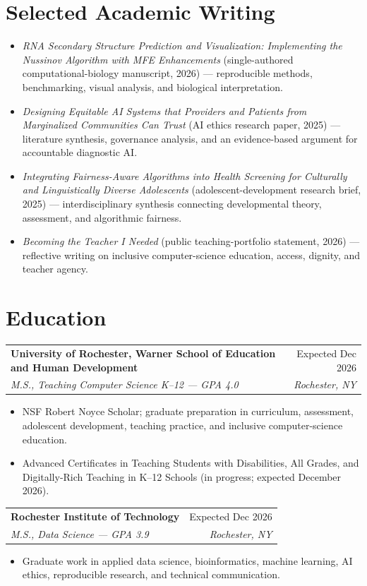 \documentclass[10pt,letterpaper]{article}
\makeatletter
\newcommand{\entry}[4]{%
  \noindent\begin{tabularx}{\textwidth}{@{}Xr@{}}
    \textbf{#1} & #2 \\
    \textit{#3} & \textit{#4}
  \end{tabularx}\vspace{-1pt}
}
\makeatother
\begin{document}
\newpage

\section*{Selected Academic Writing}
\begin{itemize}
  \item \textit{RNA Secondary Structure Prediction and Visualization: Implementing the Nussinov Algorithm with MFE Enhancements} (single-authored computational-biology manuscript, 2026) --- reproducible methods, benchmarking, visual analysis, and biological interpretation.
  \item \textit{Designing Equitable AI Systems that Providers and Patients from Marginalized Communities Can Trust} (AI ethics research paper, 2025) --- literature synthesis, governance analysis, and an evidence-based argument for accountable diagnostic AI.
  \item \textit{Integrating Fairness-Aware Algorithms into Health Screening for Culturally and Linguistically Diverse Adolescents} (adolescent-development research brief, 2025) --- interdisciplinary synthesis connecting developmental theory, assessment, and algorithmic fairness.
  \item \textit{Becoming the Teacher I Needed} (public teaching-portfolio statement, 2026) --- reflective writing on inclusive computer-science education, access, dignity, and teacher agency.
\end{itemize}

\section*{Education}

\entry{University of Rochester, Warner School of Education and Human Development}{Expected Dec 2026}{M.S., Teaching Computer Science K--12 --- GPA 4.0}{Rochester, NY}
\begin{itemize}
  \item NSF Robert Noyce Scholar; graduate preparation in curriculum, assessment, adolescent development, teaching practice, and inclusive computer-science education.
  \item Advanced Certificates in Teaching Students with Disabilities, All Grades, and Digitally-Rich Teaching in K--12 Schools (in progress; expected December 2026).
\end{itemize}

\entry{Rochester Institute of Technology}{Expected Dec 2026}{M.S., Data Science --- GPA 3.9}{Rochester, NY}
\begin{itemize}
  \item Graduate work in applied data science, bioinformatics, machine learning, AI ethics, reproducible research, and technical communication.
\end{itemize}
\end{document}
